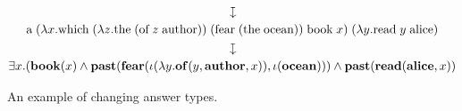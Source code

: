 \begin{landscape}
\begin{figure}
\begin{mdframed}
      \vspace*{-1\baselineskip}
      \begin{gather*}
        \downmapsto
        \\
        \text{a}\;(\lambda{x}.\text{which}\;(\lambda{z}.\text{the}\;
        (\text{of}\;z\;\text{author}))\;(\text{fear}\;(\text{the}\;\text{ocean}))\;
        \text{book}\;x)\;(\lambda{y}.\text{read}\;y\;\text{alice})
        \\
        \downmapsto
        \\
        \exists{x}.
        (\BOOK(x)\wedge\PAST(\FEAR(\iota(\lambda{y}.\OF(y,\AUTHOR,x)),\iota(\OCEAN)))
        \wedge\PAST(\READ(\ALICE,x))
      \end{gather*}
    \end{mdframed}
    \caption{An example of changing answer types.}
    \label{fig:example-changing-answer-type}
  \end{figure}
\end{landscape}
%
